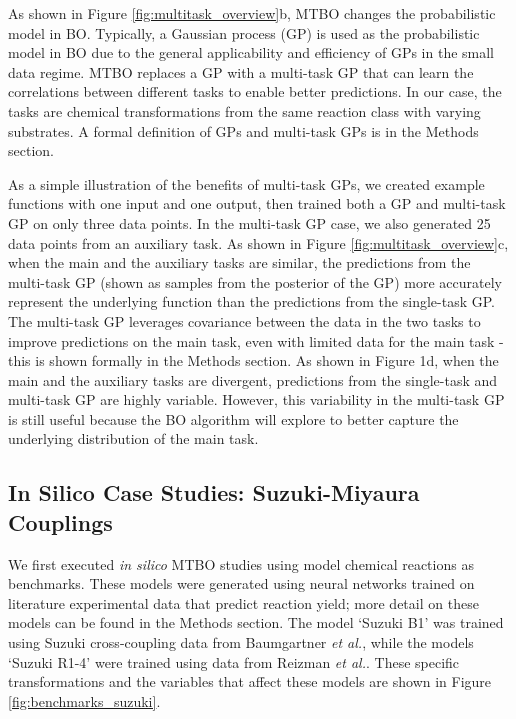 As shown in Figure \ref{fig:multitask_overview}b, MTBO changes the probabilistic model in BO. Typically, a Gaussian process (GP) is used as the probabilistic model in BO due to the general applicability and efficiency of GPs in the small data regime.\cite{Snoek2012} MTBO replaces a GP with a multi-task GP that can learn the correlations between different tasks to enable better predictions. In our case, the tasks are chemical transformations from the same reaction class with varying substrates. A formal definition of GPs and multi-task GPs is in the Methods section.

As a simple illustration of the benefits of multi-task GPs, we created example functions with one input and one output, then trained both a GP and multi-task GP on only three data points. In the multi-task GP case, we also generated 25 data points from an auxiliary task. As shown in Figure \ref{fig:multitask_overview}c, when the main and the auxiliary tasks are similar, the predictions from the multi-task GP (shown as samples from the posterior of the GP) more accurately represent the underlying function than the predictions from the single-task GP. The multi-task GP leverages covariance between the data in the two tasks to improve predictions on the main task, even with limited data for the main task - this is shown formally in the Methods section. As shown in Figure 1d, when the main and the auxiliary tasks are divergent, predictions from the single-task and multi-task GP are highly variable. However, this variability in the multi-task GP is still useful because the BO algorithm will explore to better capture the underlying distribution of the main task.

\subsection{In Silico Case Studies: Suzuki-Miyaura Couplings}

We first executed \textit{in silico} MTBO studies using model chemical reactions as benchmarks. These models were generated using neural networks trained on literature experimental data that predict reaction yield; more detail on these models can be found in the Methods section. The model `Suzuki B1' was trained using Suzuki cross-coupling data from Baumgartner \textit{et al.},\cite{Baumgartner2018} while the models `Suzuki R1-4' were trained using data from Reizman \textit{et al.}\cite{Reizman2016a}.  These specific transformations and the variables that affect these models are shown in Figure \ref{fig:benchmarks_suzuki}.

